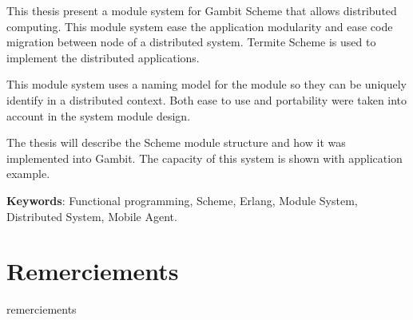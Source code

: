 \documentclass[12pt,initial,twoside,maitrise]{dms}
\numberwithin{equation}{section}
\numberwithin{table}{chapter}
\numberwithin{figure}{chapter}
\begin{document}
This thesis present a module system for Gambit Scheme
that allows distributed computing. This module system
ease the application modularity and ease code migration
between node of a distributed system. Termite Scheme is
used to implement the distributed applications.

This module system uses a naming model for the module
so they can be uniquely identify in a distributed
context. Both ease to use and portability were taken
into account in the system module design.

The thesis will describe the Scheme module structure and how
it was implemented into Gambit. The capacity of this system
is shown with application example.

\vspace*{1.5ex}
\noindent\textbf{Keywords}: Functional programming, Scheme, Erlang,
Module System, Distributed System, Mobile Agent.


\francais
\cleardoublepage%
\tableofcontents
\cleardoublepage%
\listoftables
\cleardoublepage%
%
\listoffigures


\chapter*{Remerciements}

remerciements

\end{document}
